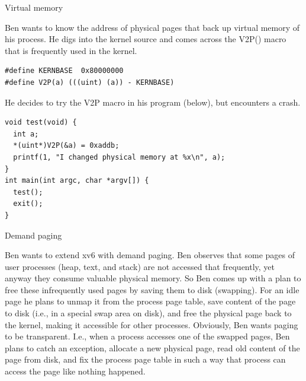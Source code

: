 \documentclass[11pt]{exam}
\def\answers{1}
\begin{document}
\begin{questions}
\begin{parts}
\fi

  \vfill

\end{parts}

\newpage
\addpoints
\question Virtual memory

Ben wants to know the address of physical pages that back up virtual memory of
his process. He digs into the kernel source and comes across the V2P() macro
that is frequently used in the kernel.

\begin{verbatim}
#define KERNBASE  0x80000000 
#define V2P(a) (((uint) (a)) - KERNBASE)
\end{verbatim}

He decides to try the V2P macro in his program (below), but encounters a crash.
\begin{verbatim}
void test(void) {
  int a;
  *(uint*)V2P(&a) = 0xaddb;
  printf(1, "I changed physical memory at %x\n", a);
}
int main(int argc, char *argv[]) {
  test();
  exit();
}
\end{verbatim}


\newpage
\addpoints
\question Demand paging 

Ben wants to extend xv6 with demand paging. Ben observes that some pages of
user processes (heap, text, and stack) are not accessed
that frequently, yet anyway they consume valuable physical memory. So Ben comes
up with a plan to free these infrequently used pages by saving them to disk (swapping). For an idle page he plans to unmap
it from the process page table, save content of the page to disk (i.e., in a special swap area on disk), and free the physical page back to the 
kernel, making it accessible for other processes. Obviously,
Ben wants paging to be transparent. I.e., when a process accesses one of the
swapped pages, Ben plans to catch an exception, allocate a new physical page,
read old content of the page from disk, and fix the process page table in such a
way that process can access the page like nothing happened. 



\end{questions}
\end{document}
